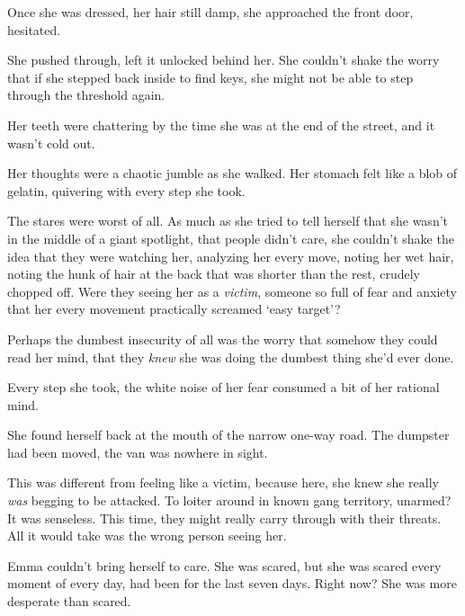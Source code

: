 Once she was dressed, her hair still damp, she approached the front door, hesitated.



She pushed through, left it unlocked behind her.  She couldn't shake the worry that if she stepped back inside to find keys, she might not be able to step through the threshold again.



Her teeth were chattering by the time she was at the end of the street, and it wasn't cold out.



Her thoughts were a chaotic jumble as she walked.  Her stomach felt like a blob of gelatin, quivering with every step she took.



The stares were worst of all.  As much as she tried to tell herself that she wasn't in the middle of a giant spotlight, that people didn't care, she couldn't shake the idea that they were watching her, analyzing her every move, noting her wet hair, noting the hunk of hair at the back that was shorter than the rest, crudely chopped off.  Were they seeing her as a \emph{victim}, someone so full of fear and anxiety that her every movement practically screamed `easy target'?



Perhaps the dumbest insecurity of all was the worry that somehow they could read her mind, that they \emph{knew} she was doing the dumbest thing she'd ever done.



Every step she took, the white noise of her fear consumed a bit of her rational mind.



She found herself back at the mouth of the narrow one-way road.  The dumpster had been moved, the van was nowhere in sight.



This was different from feeling like a victim, because here, she knew she really \emph{was} begging to be attacked.  To loiter around in known gang territory, unarmed?  It was senseless.  This time, they might really carry through with their threats.  All it would take was the wrong person seeing her.



Emma couldn't bring herself to care.  She was scared, but she was scared every moment of every day, had been for the last seven days.  Right now?  She was more desperate than scared.



